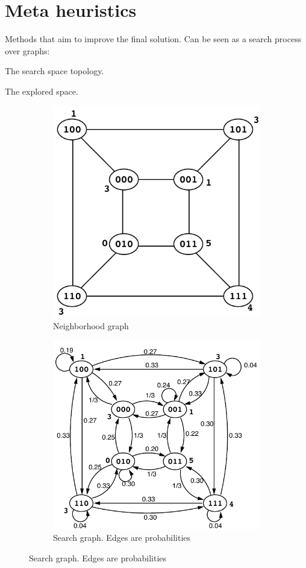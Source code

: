 \section{Meta heuristics}
Methods that aim to improve the final solution.
Can be seen as a search process over graphs:
\begin{descriptionlist}
    \item[Neighborhood graph] The search space topology.
    \item[Search graph] The explored space.
\end{descriptionlist}
\begin{figure}[H]
    \begin{subfigure}{.5\textwidth}
        \centering
        \includegraphics[width=.55\linewidth]{img/_local_search_neigh_graph.pdf}
        \caption{Neighborhood graph}
    \end{subfigure}%
    \begin{subfigure}{.5\textwidth}
        \centering
        \includegraphics[width=.60\linewidth]{img/_local_search_search_graph.pdf}
        \caption{Search graph. Edges are probabilities}
    \end{subfigure}
\end{figure}

